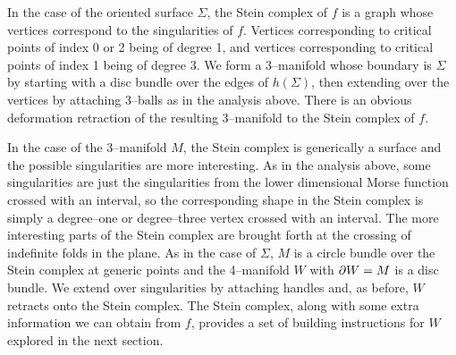 In the case of the oriented surface $\Sigma$, the Stein complex of $f$ is a graph whose vertices correspond to the singularities of $f$.
Vertices corresponding to critical points of index 0 or 2 being of degree 1, and vertices corresponding to critical points of index 1 being of degree 3.
We form a 3--manifold whose boundary is $\Sigma$ by starting with a disc bundle over the edges of $h(\Sigma)$, then extending over the vertices by attaching 3--balls as in the analysis above.
There is an obvious deformation retraction of the resulting 3--manifold to the Stein complex of $f$.

In the case of the 3--manifold $M$, the Stein complex is generically a surface and the possible singularities are more interesting.
As in the analysis above, some singularities are just the singularities from the lower dimensional Morse function crossed with an interval, so the corresponding shape in the Stein complex is simply a degree--one or degree--three vertex crossed with an interval.
The more interesting parts of the Stein complex are brought forth at the crossing of indefinite folds in the plane.
As in the case of $\Sigma$, $M$ is a circle bundle over the Stein complex at generic points and the 4--manifold $W$ with $\partial W = M$ is a disc bundle.
We extend over singularities by attaching handles and, as before, $W$ retracts onto the Stein complex.
The Stein complex, along with some extra information we can obtain from $f$, provides a set of building instructions for $W$ explored in the next section.

